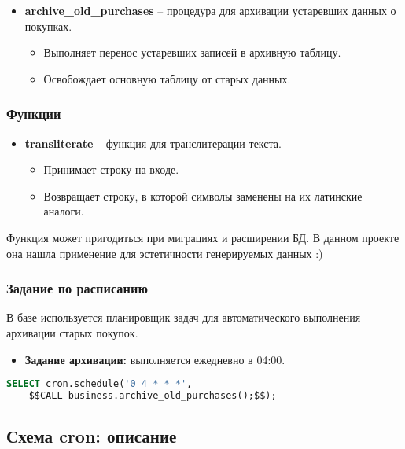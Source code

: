 \begin{itemize}
    \item \textbf{archive\_old\_purchases} – процедура для архивации устаревших данных о покупках.
    \begin{itemize}
        \item Выполняет перенос устаревших записей в архивную таблицу.
        \item Освобождает основную таблицу от старых данных.
    \end{itemize}
\end{itemize}

\subsubsection{Функции}

\begin{itemize}
    \item \textbf{transliterate} – функция для транслитерации текста.
    \begin{itemize}
        \item Принимает строку на входе.
        \item Возвращает строку, в которой символы заменены на их латинские аналоги.
    \end{itemize}
\end{itemize}

Функция может пригодиться при миграциях и расширении БД.
В данном проекте она нашла применение для эстетичности генерируемых данных :)

\subsubsection{Задание по расписанию}

В базе используется планировщик задач для автоматического выполнения архивации старых покупок.

\begin{itemize}
    \item \textbf{Задание архивации:} выполняется ежедневно в 04:00.
\end{itemize}

\begin{lstlisting}[language=SQL, frame=single, basicstyle=\normalsize\ttfamily, breaklines=true,label={lst:cronsql}]
SELECT cron.schedule('0 4 * * *',
    $$CALL business.archive_old_purchases();$$);
\end{lstlisting}

\subsection{Схема cron: описание}\label{subsec:crondesc}


